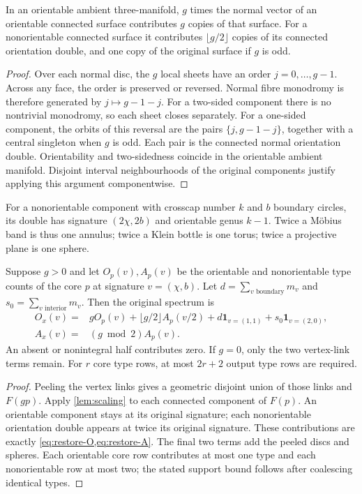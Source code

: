 \begin{lemma}
\label{lem:scaling}
In an orientable ambient three-manifold, $g$ times the normal vector of an
orientable connected surface contributes $g$ copies of that surface.
For a nonorientable connected surface it contributes
$\lfloor g/2\rfloor$ copies of its connected orientation double, and one
copy of the original surface if $g$ is odd.
\end{lemma}
\begin{proof}
Over each normal disc, the $g$ local sheets have an order
$j=0,\ldots,g-1$. Across any face, the order is preserved or reversed.
Normal fibre monodromy is therefore generated by
$j\mapsto g-1-j$. For a two-sided component there is no nontrivial
monodromy, so each sheet closes separately. For a one-sided component,
the orbits of this reversal are the pairs $\{j,g-1-j\}$, together with
a central singleton when $g$ is odd. Each pair is the connected normal
orientation double. Orientability and two-sidedness coincide in the
orientable ambient manifold. Disjoint interval neighbourhoods of the
original components justify applying this argument componentwise.
\end{proof}

For a nonorientable component with crosscap number $k$ and $b$ boundary
circles, its double has signature $(2\chi,2b)$ and orientable genus $k-1$.
Twice a M\"obius band is thus one annulus; twice a Klein bottle is one
torus; twice a projective plane is one sphere.

\begin{theorem}
\label{thm:core}
Suppose $g>0$ and let $O_p(v),A_p(v)$ be the orientable and nonorientable
type counts of the core $p$ at signature $v=(\chi,b)$. Let
$d=\sum_{v\text{ boundary}}m_v$ and
$s_0=\sum_{v\text{ interior}}m_v$. Then the original spectrum is
\begin{align}
 O_x(v)={}&gO_p(v)+\lfloor g/2\rfloor A_p(v/2)
                +d\mathbf1_{v=(1,1)}+s_0\mathbf1_{v=(2,0)},
 \label{eq:restore-O}\\
 A_x(v)={}&(g\bmod2)A_p(v).
 \label{eq:restore-A}
\end{align}
An absent or nonintegral half contributes zero. If $g=0$, only the two
vertex-link terms remain. For $r$ core type rows, at most $2r+2$ output
type rows are required.
\end{theorem}
\begin{proof}
Peeling the vertex links gives a geometric disjoint union of those links
and $F(gp)$. Apply \cref{lem:scaling} to each connected component of
$F(p)$. An orientable component stays at its original signature; each
nonorientable orientation double appears at twice its original signature.
These contributions are exactly \cref{eq:restore-O,eq:restore-A}.
The final two terms add the peeled discs and spheres. Each orientable
core row contributes at most one type and each nonorientable row at most
two; the stated support bound follows after coalescing identical types.
\end{proof}


